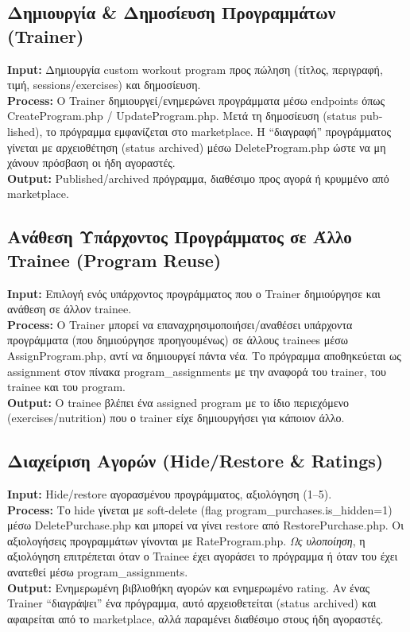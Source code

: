 \documentclass[12pt,a4paper]{report}
\begin{document}
\subsection{Δημιουργία \& Δημοσίευση Προγραμμάτων (Trainer)}
\textbf{Input:} Δημιουργία custom workout program προς πώληση (τίτλος, περιγραφή, τιμή, sessions/exercises) και δημοσίευση. \\
\textbf{Process:} Ο Trainer δημιουργεί/ενημερώνει προγράμματα μέσω endpoints όπως \textenglish{CreateProgram.php / UpdateProgram.php}. Μετά τη δημοσίευση (status \textenglish{published}), το πρόγραμμα εμφανίζεται στο marketplace. Η ``διαγραφή'' προγράμματος γίνεται με αρχειοθέτηση (status \textenglish{archived}) μέσω \textenglish{DeleteProgram.php} ώστε να μη χάνουν πρόσβαση οι ήδη αγοραστές. \\
\textbf{Output:} Published/archived πρόγραμμα, διαθέσιμο προς αγορά ή κρυμμένο από marketplace.

\subsection{Ανάθεση Υπάρχοντος Προγράμματος σε Άλλο Trainee (Program Reuse)}
\textbf{Input:} Επιλογή ενός υπάρχοντος προγράμματος που ο Trainer δημιούργησε και ανάθεση σε άλλον trainee. \\
\textbf{Process:} Ο Trainer μπορεί να επαναχρησιμοποιήσει/αναθέσει υπάρχοντα προγράμματα (που δημιούργησε προηγουμένως) σε άλλους trainees μέσω \textenglish{AssignProgram.php}, αντί να δημιουργεί πάντα νέα. Το πρόγραμμα αποθηκεύεται ως assignment στον πίνακα \textenglish{program\_assignments} με την αναφορά του trainer, του trainee και του program. \\
\textbf{Output:} Ο trainee βλέπει ένα assigned program με το ίδιο περιεχόμενο (exercises/nutrition) που ο trainer είχε δημιουργήσει για κάποιον άλλο.

\subsection{Διαχείριση Αγορών (Hide/Restore \& Ratings)}
\textbf{Input:} Hide/restore αγορασμένου προγράμματος, αξιολόγηση (1--5). \\
\textbf{Process:} Το hide γίνεται με soft-delete (flag \textenglish{program\_purchases.is\_hidden=1}) μέσω \textenglish{DeletePurchase.php} και μπορεί να γίνει restore από \textenglish{RestorePurchase.php}. Οι αξιολογήσεις προγραμμάτων γίνονται με \textenglish{RateProgram.php}. \textit{Ως υλοποίηση}, η αξιολόγηση επιτρέπεται όταν ο Trainee έχει αγοράσει το πρόγραμμα ή όταν του έχει ανατεθεί μέσω \textenglish{program\_assignments}. \\
\textbf{Output:} Ενημερωμένη βιβλιοθήκη αγορών και ενημερωμένο rating. Αν ένας Trainer ``διαγράψει'' ένα πρόγραμμα, αυτό αρχειοθετείται (status \textenglish{archived}) και αφαιρείται από το marketplace, αλλά παραμένει διαθέσιμο στους ήδη αγοραστές.
\end{document}

